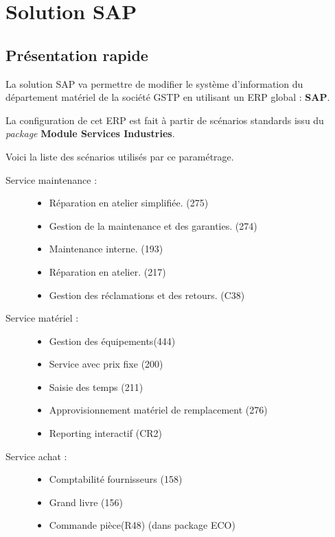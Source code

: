 \section{Solution SAP}

\subsection{Présentation rapide}

La solution SAP va permettre de modifier le système d'information du département
matériel de la société GSTP en utilisant un ERP global : {\bf SAP}.

La configuration de cet ERP est fait à partir de scénarios standards issu du {\sl package}
{\bf Module Services Industries}.

Voici la liste des scénarios utilisés par ce paramétrage.

\begin{description}
\item [Service maintenance :]
\begin{itemize}
    \item Réparation en atelier simplifiée. (275)
    \item Gestion de la maintenance et des garanties. (274)
    \item Maintenance interne. (193)
    \item Réparation en atelier. (217)
    \item Gestion des réclamations et des retours. (C38)
\end{itemize}

\item [Service matériel :]
\begin{itemize}
    \item Gestion des équipements(444)
    \item Service avec prix fixe (200)
    \item Saisie des temps (211)
    \item Approvisionnement matériel de remplacement (276)
    \item Reporting interactif (CR2)
\end{itemize}
\item [Service achat :]
\begin{itemize}
    \item Comptabilité fournisseurs (158)
    \item Grand livre (156)
    \item Commande pièce(R48) (dans package ECO)
\end{itemize}
\end{description}

